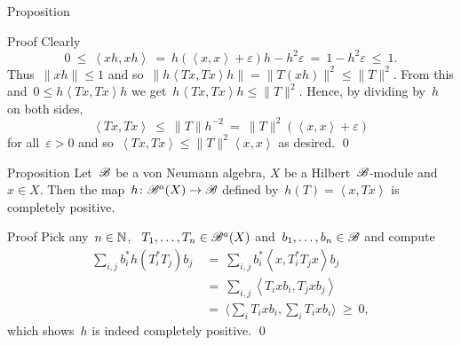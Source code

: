\documentclass[b]{subfiles}
\begin{document}
\begin{parsec}
\begin{point}{Proposition}
\begin{point}{Proof}
Clearly
\begin{equation*}
0 \ \leq\  \left<xh,xh\right>
    \ =\  h (\left<x,x\right> + \varepsilon)h - h^2 \varepsilon
    \ =\  1 - h^2 \varepsilon \ \leq\  1.
\end{equation*}
Thus~$\|xh\| \leq 1$
and so~$\|h\left<Tx, Tx\right>h\| = \|T(xh)\|^2 \leq \|T\|^2$.
From this and~$0 \leq h\left<Tx,Tx\right>h$
we get~$h\left<Tx,Tx\right>h \leq \|T\|^2$. Hence, by dividing by~$h$
    on both sides,
\begin{equation*}
\left<Tx,Tx\right> \ \leq \ \|T\| h^{-2}\  =
    \  \|T\|^2(\left<x,x\right> + \varepsilon)
\end{equation*}
for all~$\varepsilon > 0$
and so~$\left<Tx,Tx\right> \leq \|T\|^2 \left<x,x\right>$ as desired. \qed
\end{point}
\end{point}
\end{parsec}

\begin{parsec}%
\begin{point}{Proposition}%
Let~$\mathscr{B}$ be a von Neumann algebra,
    $X$ be a Hilbert~$\mathscr{B}$-module
    and~$x \in X$.
Then the map~$h\colon \mathscr{B}^a(X )\to \mathscr{B}$
defined by~$h(T) = \left<x,Tx\right>$
is completely positive.
\begin{point}{Proof}%
Pick any~$n \in \mathbb{N}$, ~$T_1, \ldots, T_n \in \mathscr{B}^a(X)$
    and~$b_1, \ldots, b_n \in \mathscr{B}$
    and compute
\begin{align*}
\sum_{i,j} b_i^* h(T_i^*T_j)b_j
&\ =\ \sum_{i,j} b_i^* \left<x,T_i^*T_j x\right> b_j\\
&\ =\ \sum_{i,j} \left<T_i x b_i,T_j x b_j\right>  \\
&\ =\ \bigl\langle\sum_i T_i x b_i, \sum_i T_i x b_i\bigr\rangle \ \geq\  0,
\end{align*}
which shows~$h$ is indeed completely positive. \qed
\end{point}
\end{point}
\end{parsec}
\end{document}

